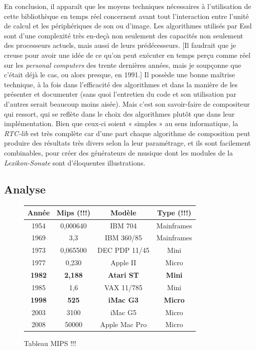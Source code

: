 \documentclass[a4paper,12pt]{article}
\begin{document}
En conclusion, il apparaît que les moyens techniques nécessaires à l'utilisation de cette bibliothèque en temps réel concernent avant tout l'interaction entre l'unité de calcul et les périphériques de son ou d'image. Les algorithmes utilisés par Essl sont d'une complexité très en-deçà non seulement des capacités non seulement des processeurs actuels, mais aussi de leurs prédécesseurs. [Il faudrait que je creuse pour avoir une idée de ce qu'on peut exécuter en temps perçu comme réel sur les \emph{personal computers} des trente dernières années, mais je soupçonne que c'était déjà le cas, ou alors presque, en 1991.] Il possède une bonne maîtrise technique, à la fois dans l'efficacité des algorithmes et dans la manière de les présenter et documenter (sans quoi l'entretien du code et son utilisation par d'autres serait beaucoup moins aisée). Mais c'est son savoir-faire de compositeur qui ressort, qui se reflète dans le choix des algorithmes plutôt que dans leur implémentation. Bien que ceux-ci soient « simples » au sens informatique, la \emph{RTC-lib} est très complète car d'une part chaque algorithme de composition peut produire des résultats très divers selon la leur paramétrage, et ils sont facilement combinables, pour créer des générateurs de musique dont les modules de la \emph{Lexikon-Sonate} sont d'éloquentes illustrations.



\subsection{Analyse}



\begin{figure}
\begin{center}
\begin{tabular}{|c|c|c|c|}
\hline
\textbf{Année} & \textbf{Mips} (!!!) & \textbf{Modèle} & \textbf{Type} (!!!) \\
\hline
1954 & 0,000640 & IBM 704 & Mainframes \\
\hline
1969 & 3,3 & IBM 360/85 & Mainframes \\
\hline
1973 & 0,065500 & DEC PDP 11/45 & Mini \\
\hline
1977 & 0,230 & Apple II & Micro \\
\hline
\textbf{1982} & \textbf{2,188} & \textbf{Atari ST} & \textbf{Mini} \\
\hline
1985 & 1,6 & VAX 11/785 & Mini \\
\hline
\textbf{1998} & \textbf{525} & \textbf{iMac G3} & \textbf{Micro} \\
\hline
2003 & 3100 & iMac G5 & Micro \\
\hline
2008 & 50000 & Apple Mac Pro & Micro \\
\hline
\end{tabular}
\end{center}
\caption{Tableau MIPS !!!}
\label{tableaumips}
\end{figure}
\end{document}
